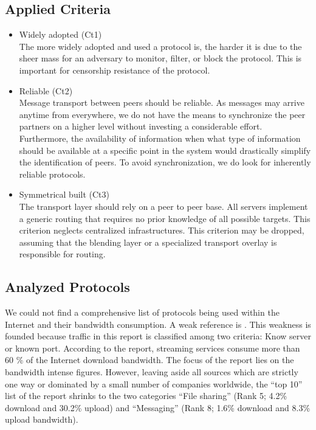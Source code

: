 \subsection{Applied Criteria\label{sec:transportCriteria}}
\begin{itemize}
	\item Widely adopted (Ct1)\\
	The more widely adopted and used a protocol is, the harder it is due to the sheer mass for an adversary to monitor, filter, or block the protocol. This is important for censorship resistance of the protocol. 
	\item Reliable (Ct2)\\
	Message transport between peers should be reliable. As messages may arrive anytime from everywhere, we do not have the means to synchronize the peer partners on a higher level without investing a considerable effort. Furthermore, the availability of information when what type of information should be available at a specific point in the system would drastically simplify the identification of peers. To avoid synchronization, we do look for inherently reliable protocols.
	\item Symmetrical built (Ct3)\\
	The transport layer should rely on a peer to peer base. All servers implement a generic routing that requires no prior knowledge of all possible targets. This criterion neglects centralized infrastructures. This criterion may be dropped, assuming that the blending layer or a specialized transport overlay is responsible for routing.
\end{itemize}

\subsection{Analyzed Protocols}
We could not find a comprehensive list of protocols being used within the Internet and their bandwidth consumption. A weak reference is \cite{zhou2011examining}. This weakness is founded because traffic in this report is classified among two criteria: Know server or known port. According to the report, streaming services consume more than 60 \% of the Internet download bandwidth. The focus of the report lies on the bandwidth intense figures. However, leaving aside all sources which are strictly one way or dominated by a small number of companies worldwide, the ``top 10'' list of the report shrinks to the two categories ``File sharing'' (Rank 5; 4.2\% download and 30.2\% upload) and ``Messaging'' (Rank 8; 1.6\% download and 8.3\% upload bandwidth). 

